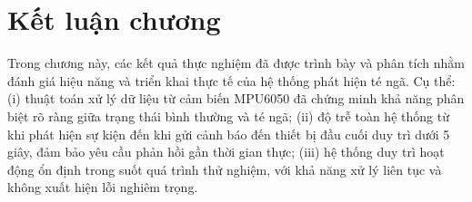 \section{Kết luận chương}
\label{sec:chapter4_conclusion}

Trong chương này, các kết quả thực nghiệm đã được trình bày và phân tích nhằm đánh giá hiệu năng và triển khai thực tế của hệ thống phát hiện té ngã. Cụ thể: 
(i) thuật toán xử lý dữ liệu từ cảm biến MPU6050 đã chứng minh khả năng phân biệt rõ ràng giữa trạng thái bình thường và té ngã; 
(ii) độ trễ toàn hệ thống từ khi phát hiện sự kiện đến khi gửi cảnh báo đến thiết bị đầu cuối duy trì dưới 5 giây, đảm bảo yêu cầu phản hồi gần thời gian thực; 
(iii) hệ thống duy trì hoạt động ổn định trong suốt quá trình thử nghiệm, với khả năng xử lý liên tục và không xuất hiện lỗi nghiêm trọng.


